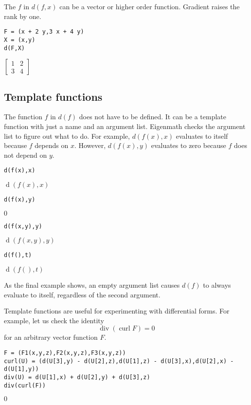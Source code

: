 \bigskip
\noindent
The $f$ in $d(f,x)$ can be a vector or higher order function.
Gradient raises the rank by one.

{\color{blue}
\begin{verbatim}
F = (x + 2 y,3 x + 4 y)
X = (x,y)
d(F,X)
\end{verbatim}
}

\noindent
$\displaystyle
\begin{bmatrix}
1 & 2
\\[1ex]
3 & 4
\end{bmatrix}
$

\subsection{Template functions}

The function $f$ in $d(f)$ does not have to be defined.
It can be a template function with just a name and an argument list.
Eigenmath checks the argument list to figure out what to do.
For example, $d(f(x),x)$ evaluates to itself because $f$ depends on $x$.
However, $d(f(x),y)$ evaluates to zero because $f$ does not depend on $y$.

{\color{blue}
\begin{verbatim}
d(f(x),x)
\end{verbatim}
}

\noindent
$\operatorname{d}(f(x),x)$

{\color{blue}
\begin{verbatim}
d(f(x),y)
\end{verbatim}
}

\noindent
$0$

{\color{blue}
\begin{verbatim}
d(f(x,y),y)
\end{verbatim}
}

\noindent
$\operatorname{d}(f(x,y),y)$

{\color{blue}
\begin{verbatim}
d(f(),t)
\end{verbatim}
}

\noindent
$\operatorname{d}(f(),t)$

\bigskip
\noindent
As the final example shows, an empty argument list causes
$d(f)$ to always evaluate to itself, regardless
of the second argument.

\bigskip
\noindent
Template functions are useful for experimenting with differential forms.
For example, let us check the identity
$$\operatorname{div}(\operatorname{curl}{F})=0$$
for an arbitrary vector function $F$.

{\color{blue}
\begin{verbatim}
F = (F1(x,y,z),F2(x,y,z),F3(x,y,z))
curl(U) = (d(U[3],y) - d(U[2],z),d(U[1],z) - d(U[3],x),d(U[2],x) - d(U[1],y))
div(U) = d(U[1],x) + d(U[2],y) + d(U[3],z)
div(curl(F))
\end{verbatim}
}

\noindent
$0$
